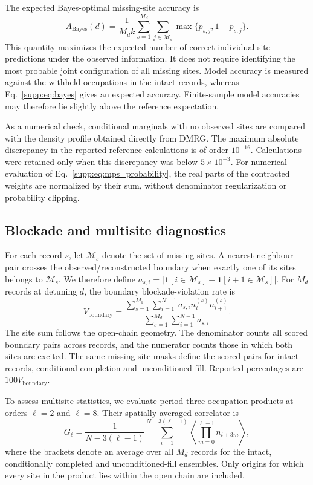 \documentclass[11pt,a4paper]{article}
\newcommand{\ind}{\mathbf{1}}
\newcommand{\subhead}[1]{\subsection*{#1}}
\begin{document}
The expected Bayes-optimal missing-site accuracy is
\begin{equation}
A_{\mathrm{Bayes}}(d)
=
\frac{1}{M_d k}
\sum_{s=1}^{M_d}\sum_{j\in\mathcal{M}_s}
\max\{p_{s,j},1-p_{s,j}\}.
\label{supp:eq:bayes}
\end{equation}
This quantity maximizes the expected number of correct individual
site predictions under the observed information. It does not require
identifying the most probable joint configuration of all missing
sites. Model accuracy is measured against the withheld occupations
in the intact records, whereas Eq.~\eqref{supp:eq:bayes} gives an
expected accuracy. Finite-sample model accuracies may therefore lie
slightly above the reference expectation.

As a numerical check, conditional marginals with no observed sites
are compared with the density profile obtained directly from DMRG.
The maximum absolute discrepancy in the reported reference
calculations is of order $10^{-16}$. Calculations were retained only when this discrepancy was below $5\times10^{-3}$.
For numerical evaluation of Eq.~\eqref{supp:eq:mps_probability},
the real parts of the contracted weights are normalized by their
sum, without denominator regularization or probability clipping.

\subhead{Blockade and multisite diagnostics}
For each record $s$, let $\mathcal{M}_s$ denote the set of missing
sites. A nearest-neighbour pair crosses the observed/reconstructed
boundary when exactly one of its sites belongs to $\mathcal{M}_s$.
We therefore define
$a_{s,i}=|\ind[i\in\mathcal{M}_s]-\ind[i+1\in\mathcal{M}_s]|$.
For $M_d$ records at detuning $d$, the boundary blockade-violation
rate is
\begin{equation}
V_{\mathrm{boundary}}
=
\frac{
\sum_{s=1}^{M_d}\sum_{i=1}^{N-1}
a_{s,i}n_i^{(s)}n_{i+1}^{(s)}
}{
\sum_{s=1}^{M_d}\sum_{i=1}^{N-1}a_{s,i}
}.
\label{supp:eq:blockade}
\end{equation}
The site sum follows the open-chain geometry. The denominator counts
all scored boundary pairs across records, and the numerator counts
those in which both sites are excited. The same missing-site masks
define the scored pairs for intact records, conditional completion
and unconditioned fill. Reported percentages are
$100V_{\mathrm{boundary}}$.

To assess multisite statistics, we evaluate period-three occupation
products at orders $\ell=2$ and $\ell=8$. Their spatially averaged
correlator is
\begin{equation}
G_\ell
=
\frac{1}{N-3(\ell-1)}
\sum_{i=1}^{N-3(\ell-1)}
\left\langle
\prod_{m=0}^{\ell-1}n_{i+3m}
\right\rangle,
\label{supp:eq:ryd_multisite}
\end{equation}
where the brackets denote an average over all $M_d$ records for the
intact, conditionally completed and unconditioned-fill ensembles.
Only origins for which every site in the product lies within the
open chain are included.
\end{document}
